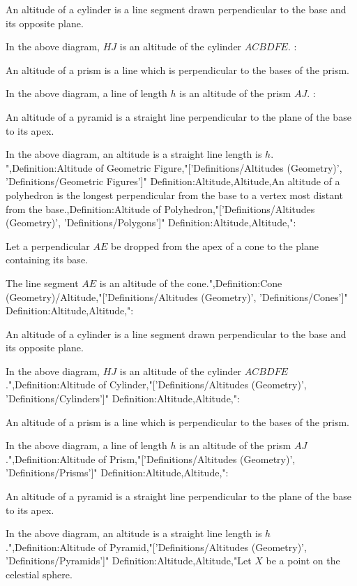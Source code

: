 An altitude of a cylinder is a line segment drawn perpendicular to the base and its opposite plane.


In the above diagram, $HJ$ is an altitude of the cylinder $ACBDFE$.
:

An altitude of a prism is a line which is perpendicular to the bases of the prism.

In the above diagram, a line of length $h$ is an altitude of the prism $AJ$.
:

An altitude of a pyramid is a straight line perpendicular to the plane of the base to its apex.

In the above diagram, an altitude is a straight line length is $h$.
",Definition:Altitude of Geometric Figure,"['Definitions/Altitudes (Geometry)', 'Definitions/Geometric Figures']"
Definition:Altitude,Altitude,An altitude of a polyhedron is the longest perpendicular from the base to a vertex most distant from the base.,Definition:Altitude of Polyhedron,"['Definitions/Altitudes (Geometry)', 'Definitions/Polygons']"
Definition:Altitude,Altitude,":

Let a perpendicular $AE$ be dropped from the apex of a cone to the plane containing its base.

The line segment $AE$ is an altitude of the cone.",Definition:Cone (Geometry)/Altitude,"['Definitions/Altitudes (Geometry)', 'Definitions/Cones']"
Definition:Altitude,Altitude,":

An altitude of a cylinder is a line segment drawn perpendicular to the base and its opposite plane.


In the above diagram, $HJ$ is an altitude of the cylinder $ACBDFE$.",Definition:Altitude of Cylinder,"['Definitions/Altitudes (Geometry)', 'Definitions/Cylinders']"
Definition:Altitude,Altitude,":

An altitude of a prism is a line which is perpendicular to the bases of the prism.

In the above diagram, a line of length $h$ is an altitude of the prism $AJ$.",Definition:Altitude of Prism,"['Definitions/Altitudes (Geometry)', 'Definitions/Prisms']"
Definition:Altitude,Altitude,":

An altitude of a pyramid is a straight line perpendicular to the plane of the base to its apex.

In the above diagram, an altitude is a straight line length is $h$.",Definition:Altitude of Pyramid,"['Definitions/Altitudes (Geometry)', 'Definitions/Pyramids']"
Definition:Altitude,Altitude,"Let $X$ be a point on the celestial sphere.

